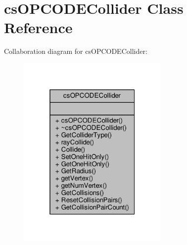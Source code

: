 \hypertarget{classcsOPCODECollider}{}\section{cs\+O\+P\+C\+O\+D\+E\+Collider Class Reference}
\label{classcsOPCODECollider}


Collaboration diagram for cs\+O\+P\+C\+O\+D\+E\+Collider\+:
\nopagebreak
\begin{figure}[H]
\begin{center}
\leavevmode
\includegraphics[width=208pt]{d8/d9a/classcsOPCODECollider__coll__graph}
\end{center}
\end{figure}
